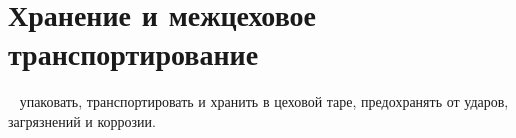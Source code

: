 
\section{Хранение и межцеховое транспортирование}
\DocProductShortTitle~ упаковать, транспортировать и хранить в цеховой таре, предохранять от ударов, загрязнений и коррозии.